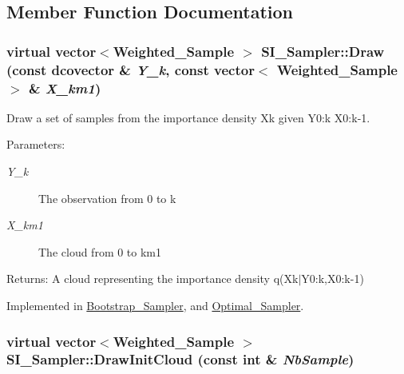 \subsection{Member Function Documentation}
\hypertarget{class_s_i___sampler_62bf57181aeb5981426a71a7bf01c3e9}{
\subsubsection[{Draw}]{\setlength{\rightskip}{0pt plus 5cm}virtual vector$<${\bf Weighted\_\-Sample} $>$ SI\_\-Sampler::Draw (const dcovector \& {\em Y\_\-k}, \/  const vector$<$ {\bf Weighted\_\-Sample} $>$ \& {\em X\_\-km1})}}
\label{class_s_i___sampler_62bf57181aeb5981426a71a7bf01c3e9}


Draw a set of samples from the importance density Xk given Y0:k X0:k-1. 

\begin{Desc}
\item[Parameters:]
\begin{description}
\item[{\em Y\_\-k}]The observation from 0 to k \item[{\em X\_\-km1}]The cloud from 0 to km1\end{description}
\end{Desc}
\begin{Desc}
\item[Returns:]A cloud representing the importance density q(Xk$|$Y0:k,X0:k-1) \end{Desc}


Implemented in \hyperlink{class_bootstrap___sampler_a826164a46c257f5a95ba0b4eba7ee83}{Bootstrap\_\-Sampler}, and \hyperlink{class_optimal___sampler_1a9288b91deaab91d0c3d3511d6e1892}{Optimal\_\-Sampler}.\hypertarget{class_s_i___sampler_3fbedf1ce189168da5608861d5a3289e}{
\subsubsection[{DrawInitCloud}]{\setlength{\rightskip}{0pt plus 5cm}virtual vector$<${\bf Weighted\_\-Sample} $>$ SI\_\-Sampler::DrawInitCloud (const int \& {\em NbSample})}}
\label{class_s_i___sampler_3fbedf1ce189168da5608861d5a3289e}


